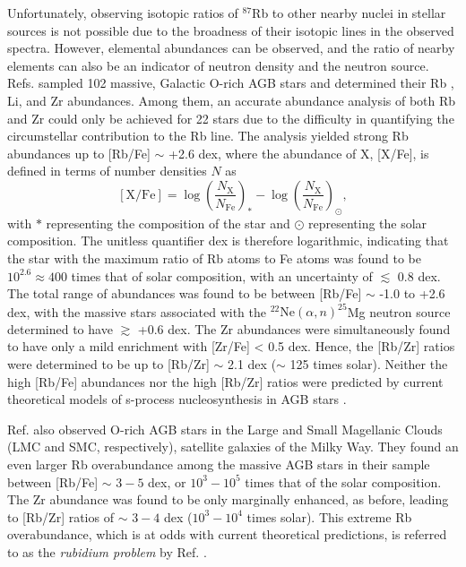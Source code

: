 Unfortunately, observing isotopic ratios of $^{87}$Rb to other nearby nuclei in stellar sources is not possible due to the broadness of their isotopic lines in the observed spectra. However, elemental abundances can be observed, and the ratio of nearby elements can also be an indicator of neutron density and the neutron source. Refs. \cite{Garcia2006,Garcia2007} sampled 102 massive, Galactic O-rich AGB stars and determined their Rb \cite{Garcia2006}, Li, and Zr \cite{Garcia2007} abundances. Among them, an accurate abundance analysis of both Rb and Zr could only be achieved for 22 stars due to the difficulty in quantifying the circumstellar contribution to the Rb line. The analysis yielded strong Rb abundances up to [Rb/Fe] $\sim$ +2.6 dex, where the abundance of X, [X/Fe], is defined in terms of number densities $N$ as
\begin{equation} \label{eqn:abundance}
[\mathrm{X}/\mathrm{Fe}] = \log\left( \frac{N_{\mathrm{X}}}{N_{\mathrm{Fe}}} \right)_{\ast} - \log\left( \frac{N_{\mathrm{X}}}{N_{\mathrm{Fe}}} \right)_{\odot},
\end{equation}
with $\ast$ representing the composition of the star and $\odot$ representing the solar composition. The unitless quantifier dex is therefore logarithmic, indicating that the star with the maximum ratio of  Rb atoms to Fe atoms was found to be $10^{2.6} \approx 400$ times that of solar composition, with an uncertainty of $\lesssim$ 0.8 dex. The total range of abundances was found to be between [Rb/Fe] $\sim$ -1.0 to +2.6 dex, with the massive stars associated with the $^{22}\mathrm{Ne}(\alpha,n)^{25}$Mg neutron source determined to have $\gtrsim$ +0.6 dex. The Zr abundances were simultaneously found to have only a mild enrichment with [Zr/Fe] < 0.5 dex. Hence, the [Rb/Zr] ratios were determined to be up to [Rb/Zr] $\sim$ 2.1 dex ($\sim$ 125 times solar). Neither the high [Rb/Fe] abundances nor the high [Rb/Zr] ratios were predicted by current theoretical models of s-process nucleosynthesis in AGB stars \cite{Raa2012,Karakas2012}. 

Ref. \cite{Garcia2009} also observed O-rich AGB stars in the Large and Small Magellanic Clouds (LMC and SMC, respectively), satellite galaxies of the Milky Way. They found an even larger Rb overabundance among the massive AGB stars in their sample between [Rb/Fe] $\sim$ $3-5$ dex, or $10^{3}-10^{5}$ times that of the solar composition. The Zr abundance was found to be only marginally enhanced, as before, leading to [Rb/Zr] ratios of $\sim$ $3-4$ dex ($10^{3}-10^{4}$ times solar). This extreme Rb overabundance, which is at odds with current theoretical predictions, is referred to as the \emph{rubidium problem} by Ref. \cite{Garcia2009}.

